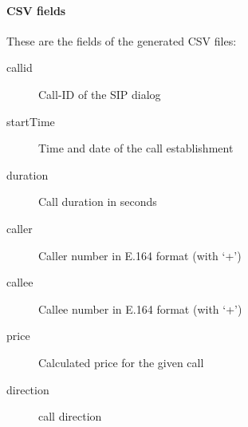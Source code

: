 \documentclass[letterpaper,10pt,english]{sphinxmanual}
\begin{document}
\paragraph{CSV fields}
\label{administration_portal/client/wholesale/calls/call_csv_schedulers:csv-fields}
These are the fields of the generated CSV files:
\begin{description}
\item[{callid}] \leavevmode{}\label{administration_portal/client/wholesale/calls/call_csv_schedulers:term-callid}
Call-ID of the SIP dialog

\item[{startTime}] \leavevmode{}\label{administration_portal/client/wholesale/calls/call_csv_schedulers:term-starttime}
Time and date of the call establishment

\item[{duration}] \leavevmode{}\label{administration_portal/client/wholesale/calls/call_csv_schedulers:term-duration}
Call duration in seconds

\item[{caller}] \leavevmode{}\label{administration_portal/client/wholesale/calls/call_csv_schedulers:term-caller}
Caller number in E.164 format (with `+')

\item[{callee}] \leavevmode{}\label{administration_portal/client/wholesale/calls/call_csv_schedulers:term-callee}
Callee number in E.164 format (with `+')

\item[{price}] \leavevmode{}\label{administration_portal/client/wholesale/calls/call_csv_schedulers:term-price}
Calculated price for the given call

\item[{direction}] \leavevmode{}\label{administration_portal/client/wholesale/calls/call_csv_schedulers:term-direction}
call direction

\end{description}
\end{document}
